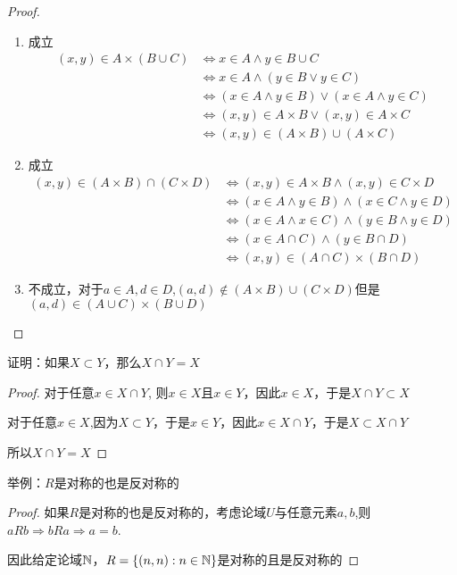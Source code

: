 \documentclass[11pt]{article}
\begin{document}
\begin{proof}
\begin{enumerate}
\item 成立
\begin{align*}
(x,y)\in A\times(B\cup C)&\Leftrightarrow x\in A\wedge y\in B\cup C\\
&\Leftrightarrow x\in A\wedge(y\in B\vee y\in C)\\
&\Leftrightarrow(x\in A\wedge y\in B)\vee(x\in A\wedge y\in C)\\
&\Leftrightarrow(x,y)\in A\times B\vee(x,y)\in A\times C\\
&\Leftrightarrow(x,y)\in(A\times B)\cup(A\times C)
\end{align*}
\item 成立
\begin{align*}
(x,y)\in(A\times B)\cap(C\times D)&\Leftrightarrow (x,y)\in A\times B\wedge (x,y)\in C\times D\\
&\Leftrightarrow(x\in A\wedge y\in B)\wedge(x\in C\wedge y\in D)\\
&\Leftrightarrow(x\in A\wedge x\in C)\wedge(y\in B\wedge y\in D)\\
&\Leftrightarrow(x\in A\cap C)\wedge(y\in B\cap D)\\
&\Leftrightarrow(x,y)\in (A\cap C)\times (B\cap D)
\end{align*}
\item 不成立，对于\(a\in A,d\in D\),\((a,d)\notin(A\times B)\cup(C\times D)\)但是\((a,d)\in(A\cup C)\times(B\cup D)\)
\end{enumerate}
\end{proof}

\begin{exercise}
证明：如果\(X\subset Y\)，那么\(X\cap Y=X\)
\end{exercise}

\begin{proof}
对于任意\(x\in X\cap Y\), 则\(x\in X\)且\(x\in Y\)，因此\(x\in X\)，于是\(X\cap Y\subset X\)

对于任意\(x\in X\),因为\(X\subset Y\)，于是\(x\in Y\)，因此\(x\in X\cap Y\)，于是\(X\subset X\cap Y\)

所以\(X\cap Y=X\)
\end{proof}

\begin{exercise}
举例：\(R\)是对称的也是反对称的
\end{exercise}

\begin{proof}
如果\(R\)是对称的也是反对称的，考虑论域\(U\)与任意元素\(a,b\),则\(aRb\Rightarrow bRa\Rightarrow a=b\).

因此给定论域\(\mathbb{N}\)，\(R=\{(n,n):n\in\mathbb{N}\}\)是对称的且是反对称的
\end{proof}
\end{document}
